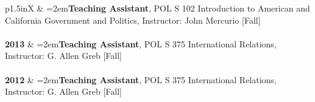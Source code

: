 \documentclass[letterpaper,12pt]{article}
\newenvironment{list2}{
  \begin{list}{$\bullet$}{%
      \setlength{\itemsep}{0in}
      \setlength{\parsep}{0in} 
      \setlength{\parskip}{0in}
      \setlength{\topsep}{0in} 
      \setlength{\partopsep}{0in}
      \setlength{\leftmargin}{1in}
      \setlength{\labelsep}{1em}
      \setlength{\labelwidth}{1em}
      \setlength{\itemindent}{-2em}
      \setlength{\listparindent}{2em}}}{\end{list}}
\begin{document}
\begin{xltabular}{\dimexpr\textwidth-0in}{p{1.5in}X}
			& \hangindent=2em\textbf{Teaching Assistant}, POL S 102 Introduction to American and California \mbox{Government} and Politics, \mbox{Instructor:} John Mercurio [Fall]\\ \\
			
\textbf{2013} 	& \hangindent=2em\textbf{Teaching Assistant}, POL S 375 International Relations, \mbox{Instructor:} G. Allen Greb [Fall]\\ \\

\textbf{2012} 	& \hangindent=2em\textbf{Teaching Assistant}, POL S 375 International Relations, \mbox{Instructor:} G. Allen Greb [Fall]\\ \\
\end{xltabular}

\end{document}
